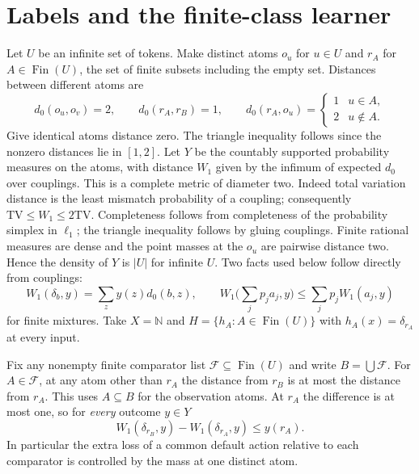 \documentclass[11pt]{article}
\newcommand{\Fin}{\operatorname{Fin}}
\newcommand{\N}{\mathbb N}
\begin{document}
\section{Labels and the finite-class learner}
Let $U$ be an infinite set of tokens. Make distinct atoms $o_u$ for $u\in U$ and $r_A$ for $A\in\Fin(U)$, the set of finite subsets including the empty set. Distances between different atoms are
\[
 d_0(o_u,o_v)=2,\qquad d_0(r_A,r_B)=1,\qquad
 d_0(r_A,o_u)=\begin{cases}1&u\in A,\\2&u\notin A.\end{cases}
\]
Give identical atoms distance zero. The triangle inequality follows since the nonzero distances lie in $[1,2]$. Let $Y$ be the countably supported probability measures on the atoms, with distance $W_1$ given by the infimum of expected $d_0$ over couplings. This is a complete metric of diameter two. Indeed total variation distance is the least mismatch probability of a coupling; consequently $\mathrm{TV}\le W_1\le2\mathrm{TV}$. Completeness follows from completeness of the probability simplex in $\ell_1$; the triangle inequality follows by gluing couplings. Finite rational measures are dense and the point masses at the $o_u$ are pairwise distance two. Hence the density of $Y$ is $|U|$ for infinite $U$. Two facts used below follow directly from couplings:
\[
 W_1(\delta_b,y)=\sum_z y(z)d_0(b,z),\qquad
 W_1\Big(\sum_j p_j a_j,y\Big)\le\sum_j p_j W_1(a_j,y)
\]
for finite mixtures. Take $X=\N$ and $H=\{h_A:A\in\Fin(U)\}$ with $h_A(x)=\delta_{r_A}$ at every input.

Fix any nonempty finite comparator list $\mathcal F\subseteq\Fin(U)$ and write $B=\bigcup\mathcal F$. For $A\in\mathcal F$, at any atom other than $r_A$ the distance from $r_B$ is at most the distance from $r_A$. This uses $A\subseteq B$ for the observation atoms. At $r_A$ the difference is at most one, so for \emph{every} outcome $y\in Y$
\[
            W_1(\delta_{r_B},y)-W_1(\delta_{r_A},y)\le y(r_A).       \tag{1}
\]
In particular the extra loss of a common default action relative to each comparator is controlled by the mass at one distinct atom.
\end{document}
